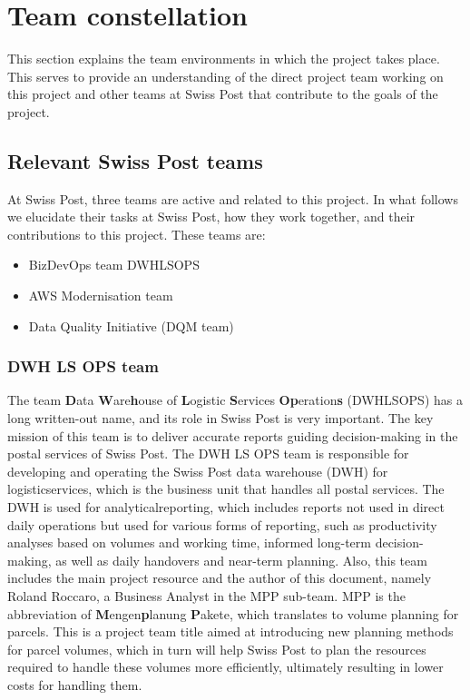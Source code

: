 \section{Team constellation}
\label{ProjMgmtTeams}
This section explains the team environments in which the project takes place. This serves to provide an understanding of the direct project team working on this project and other teams at Swiss Post that contribute to the goals of the project.

\subsection*{Relevant Swiss Post teams}

At Swiss Post, three teams are active and related to this project. In what follows we elucidate their tasks at Swiss Post, how they work together, and their contributions to this project. These teams are:

\begin{itemize}
    \item \gls{BizDevOps} team \gls{DWHLSOPS}
    \item AWS Modernisation team
    \item Data Quality Initiative (\gls{DQM} team)
\end{itemize}

\subsubsection*{DWH LS OPS team}
\label{sec:DWHLSOPSTeam}

The team \textbf{D}ata \textbf{W}are\textbf{h}ouse of \textbf{L}ogistic \textbf{S}ervices \textbf{Op}eration\textbf{s} (\gls{DWHLSOPS}) has a long written-out name, and its role in Swiss Post is very important.
The key mission of this team is to deliver accurate reports guiding decision-making in the postal services of Swiss Post.
The DWH LS OPS team is responsible for developing and operating the Swiss Post data warehouse (\gls{DWH}) for \gls{logisticservices}, which is the business unit that handles all postal services. The DWH is used for \gls{analyticalreporting}, which includes reports not used in direct daily operations but used for various forms of reporting, such as productivity analyses based on volumes and working time, informed long-term decision-making, as well as daily handovers and near-term planning.
Also, this team includes the main project resource and the author of this document, namely Roland Roccaro, a Business Analyst in the \gls{MPP} sub-team. MPP is the abbreviation of \textbf{M}engen\textbf{p}lanung \textbf{P}akete, which translates to volume planning for parcels. This is a project team title aimed at introducing new planning methods for parcel volumes, which in turn will help Swiss Post to plan the resources required to handle these volumes more efficiently, ultimately resulting in lower costs for handling them.



